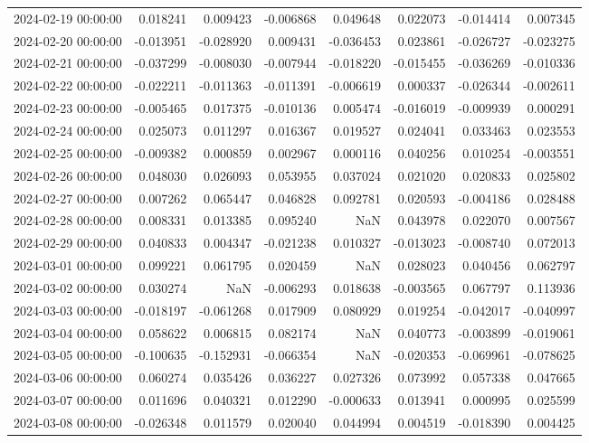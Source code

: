 \begin{tabular}{lrrrrrrr}
2024-02-19 00:00:00 & 0.018241 & 0.009423 & -0.006868 & 0.049648 & 0.022073 & -0.014414 & 0.007345 \\
2024-02-20 00:00:00 & -0.013951 & -0.028920 & 0.009431 & -0.036453 & 0.023861 & -0.026727 & -0.023275 \\
2024-02-21 00:00:00 & -0.037299 & -0.008030 & -0.007944 & -0.018220 & -0.015455 & -0.036269 & -0.010336 \\
2024-02-22 00:00:00 & -0.022211 & -0.011363 & -0.011391 & -0.006619 & 0.000337 & -0.026344 & -0.002611 \\
2024-02-23 00:00:00 & -0.005465 & 0.017375 & -0.010136 & 0.005474 & -0.016019 & -0.009939 & 0.000291 \\
2024-02-24 00:00:00 & 0.025073 & 0.011297 & 0.016367 & 0.019527 & 0.024041 & 0.033463 & 0.023553 \\
2024-02-25 00:00:00 & -0.009382 & 0.000859 & 0.002967 & 0.000116 & 0.040256 & 0.010254 & -0.003551 \\
2024-02-26 00:00:00 & 0.048030 & 0.026093 & 0.053955 & 0.037024 & 0.021020 & 0.020833 & 0.025802 \\
2024-02-27 00:00:00 & 0.007262 & 0.065447 & 0.046828 & 0.092781 & 0.020593 & -0.004186 & 0.028488 \\
2024-02-28 00:00:00 & 0.008331 & 0.013385 & 0.095240 & NaN & 0.043978 & 0.022070 & 0.007567 \\
2024-02-29 00:00:00 & 0.040833 & 0.004347 & -0.021238 & 0.010327 & -0.013023 & -0.008740 & 0.072013 \\
2024-03-01 00:00:00 & 0.099221 & 0.061795 & 0.020459 & NaN & 0.028023 & 0.040456 & 0.062797 \\
2024-03-02 00:00:00 & 0.030274 & NaN & -0.006293 & 0.018638 & -0.003565 & 0.067797 & 0.113936 \\
2024-03-03 00:00:00 & -0.018197 & -0.061268 & 0.017909 & 0.080929 & 0.019254 & -0.042017 & -0.040997 \\
2024-03-04 00:00:00 & 0.058622 & 0.006815 & 0.082174 & NaN & 0.040773 & -0.003899 & -0.019061 \\
2024-03-05 00:00:00 & -0.100635 & -0.152931 & -0.066354 & NaN & -0.020353 & -0.069961 & -0.078625 \\
2024-03-06 00:00:00 & 0.060274 & 0.035426 & 0.036227 & 0.027326 & 0.073992 & 0.057338 & 0.047665 \\
2024-03-07 00:00:00 & 0.011696 & 0.040321 & 0.012290 & -0.000633 & 0.013941 & 0.000995 & 0.025599 \\
2024-03-08 00:00:00 & -0.026348 & 0.011579 & 0.020040 & 0.044994 & 0.004519 & -0.018390 & 0.004425 \\

\end{tabular}

